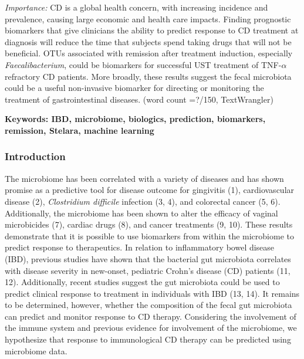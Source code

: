 \documentclass[12pt,]{article}
\begin{document}
\emph{Importance:} CD is a global health concern, with increasing
incidence and prevalence, causing large economic and health care
impacts. Finding prognostic biomarkers that give clinicians the ability
to predict response to CD treatment at diagnosis will reduce the time
that subjects spend taking drugs that will not be beneficial. OTUs
associated with remission after treatment induction, especially
\emph{Faecalibacterium}, could be biomarkers for successful UST
treatment of TNF-\({\alpha}\) refractory CD patients. More broadly,
these results suggest the fecal microbiota could be a useful
non-invasive biomarker for directing or monitoring the treatment of
gastrointestinal diseases. (word count =?/150, TextWrangler)

\textbf{Keywords: IBD, microbiome, biologics, prediction, biomarkers,
remission, Stelara, machine learning}

\newpage

\subsubsection{Introduction}\label{introduction}

The microbiome has been correlated with a variety of diseases and has
shown promise as a predictive tool for disease outcome for gingivitis
(1), cardiovascular disease (2), \emph{Clostridium difficile} infection
(3, 4), and colorectal cancer (5, 6). Additionally, the microbiome has
been shown to alter the efficacy of vaginal microbicides (7), cardiac
drugs (8), and cancer treatments (9, 10). These results demonstrate that
it is possible to use biomarkers from within the microbiome to predict
response to therapeutics. In relation to inflammatory bowel disease
(IBD), previous studies have shown that the bacterial gut microbiota
correlates with disease severity in new-onset, pediatric Crohn's disease
(CD) patients (11, 12). Additionally, recent studies suggest the gut
microbiota could be used to predict clinical response to treatment in
individuals with IBD (13, 14). It remains to be determined, however,
whether the composition of the fecal gut microbiota can predict and
monitor response to CD therapy. Considering the involvement of the
immune system and previous evidence for involvement of the microbiome,
we hypothesize that response to immunological CD therapy can be
predicted using microbiome data.
\end{document}
